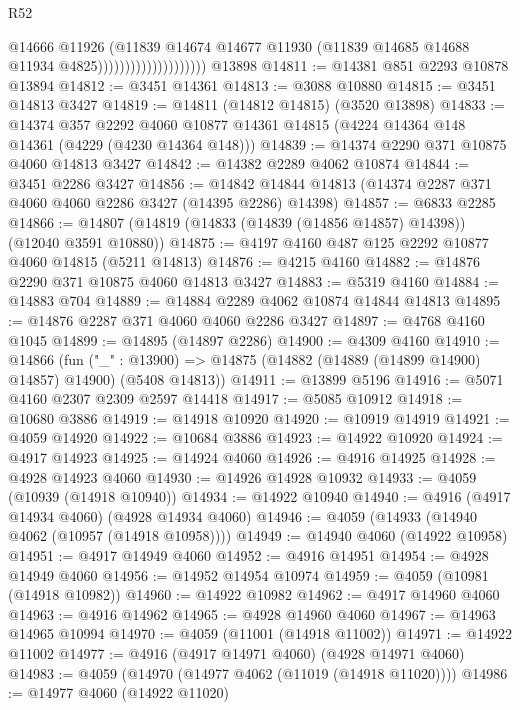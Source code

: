 \begin{lexlean}{R52}
\begin{coremodule}
                                        @14666
                                        @11926
                                        (@11839
                                          @14674
                                          @14677
                                          @11930
                                          (@11839 @14685 @14688 @11934 @4825))))))))))))))))))))
    @13898
@14811 := @14381 @851 @2293 @10878 @13894
@14812 := @3451 @14361
@14813 := @3088 @10880
@14815 := @3451 @14813 @3427
@14819 := @14811 (@14812 @14815) (@3520 @13898)
@14833 := @14374
    @357
    @2292
    @4060
    @10877
    @14361
    @14815
    (@4224 @14364 @148 @14361 (@4229 (@4230 @14364 @148)))
@14839 := @14374 @2290 @371 @10875 @4060 @14813 @3427
@14842 := @14382 @2289 @4062 @10874
@14844 := @3451 @2286 @3427
@14856 := @14842 @14844 @14813 (@14374 @2287 @371 @4060 @4060 @2286 @3427 (@14395 @2286) @14398)
@14857 := @6833 @2285
@14866 := @14807 (@14819 (@14833 (@14839 (@14856 @14857) @14398)) (@12040 @3591 @10880))
@14875 := @4197 @4160 @487 @125 @2292 @10877 @4060 @14815 (@5211 @14813)
@14876 := @4215 @4160
@14882 := @14876 @2290 @371 @10875 @4060 @14813 @3427
@14883 := @5319 @4160
@14884 := @14883 @704
@14889 := @14884 @2289 @4062 @10874 @14844 @14813
@14895 := @14876 @2287 @371 @4060 @4060 @2286 @3427
@14897 := @4768 @4160 @1045
@14899 := @14895 (@14897 @2286)
@14900 := @4309 @4160
@14910 := @14866
    (fun ("_" : @13900) => @14875 (@14882 (@14889 (@14899 @14900) @14857) @14900) (@5408 @14813))
@14911 := @13899 @5196
@14916 := @5071 @4160 @2307 @2309 @2597 @14418
@14917 := @5085 @10912
@14918 := @10680 @3886
@14919 := @14918 @10920
@14920 := @10919 @14919
@14921 := @4059 @14920
@14922 := @10684 @3886
@14923 := @14922 @10920
@14924 := @4917 @14923
@14925 := @14924 @4060
@14926 := @4916 @14925
@14928 := @4928 @14923 @4060
@14930 := @14926 @14928 @10932
@14933 := @4059 (@10939 (@14918 @10940))
@14934 := @14922 @10940
@14940 := @4916 (@4917 @14934 @4060) (@4928 @14934 @4060)
@14946 := @4059 (@14933 (@14940 @4062 (@10957 (@14918 @10958))))
@14949 := @14940 @4060 (@14922 @10958)
@14951 := @4917 @14949 @4060
@14952 := @4916 @14951
@14954 := @4928 @14949 @4060
@14956 := @14952 @14954 @10974
@14959 := @4059 (@10981 (@14918 @10982))
@14960 := @14922 @10982
@14962 := @4917 @14960 @4060
@14963 := @4916 @14962
@14965 := @4928 @14960 @4060
@14967 := @14963 @14965 @10994
@14970 := @4059 (@11001 (@14918 @11002))
@14971 := @14922 @11002
@14977 := @4916 (@4917 @14971 @4060) (@4928 @14971 @4060)
@14983 := @4059 (@14970 (@14977 @4062 (@11019 (@14918 @11020))))
@14986 := @14977 @4060 (@14922 @11020)

\end{coremodule}
\end{lexlean}

